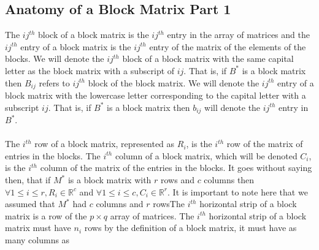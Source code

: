 \documentclass{article}
\begin{document}
\subsection{Anatomy of a Block Matrix Part 1}
The $ij^{th}$ block of a block matrix is the $ij^{th}$ entry in the array of matrices and the $ij^{th}$ entry of a block matrix is the $ij^{th}$ entry of the matrix of the elements of the blocks. We will denote the $ij^{th}$ block of a block matrix with the same capital letter as the block matrix with a subscript of $ij$. That is, if $B^*$ is a block matrix then $B_{ij}$ refers to $ij^{th}$ block of the block matrix. We will denote the $ij^{th}$ entry of a block matrix with the lowercase letter corresponding to the capital letter with a subscript $ij$. That is, if $B^*$ is a block matrix then $b_{ij}$ will denote the $ij^{th}$ entry in $B^*$.\\\\
The $i^{th}$ row of a block matrix, represented as $R_i$, is the $i^{th}$ row of the matrix of entries in the blocks. The $i^{th}$ column of a block matrix, which will be denoted $C_i$, is the $i^{th}$ column of the matrix of the entries in the blocks. It goes without saying then, that if $M^*$ is a block matrix with $r$ rows and $c$ columns then $\forall 1 \leq i \leq r, R_i \in \mathbb{R}^c$ and $\forall 1 \leq i \leq c, C_i \in \mathbb{R}^r$. It is important to note here that we assumed that $M^*$ had $c$ columns and $r$ rowsThe $i^{th}$ horizontal strip of a block matrix is a row of the $p \times q$ array of matrices. The $i^{th}$ horizontal strip of a block matrix must have $n_i$ rows by the definition of a block matrix, it must have as many columns as 
\end{document}
